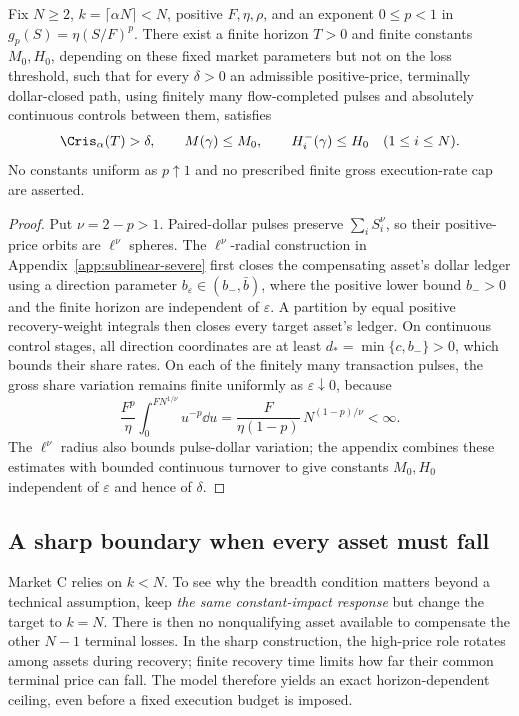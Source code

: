 \documentclass[review,hidelinks,onefignum,onetabnum]{siamonline250211}
\begin{document}
\begin{theorem}\label{thm:sublinear-severe}
Fix $N\ge2$, $k=\lceil\alpha N\rceil<N$, positive $F,\eta,\rho$,
and an exponent $0\le p<1$ in
$g_p(S)=\eta(S/F)^p$. There exist a finite horizon $T>0$
and finite constants $M_0,H_0$, depending on these fixed
market parameters but not on the loss threshold, such that for
every $\delta>0$ an admissible positive-price,
terminally dollar-closed path, using finitely many
flow-completed pulses and absolutely continuous controls
between them, satisfies
\[
\Cris_\alpha(T)>\delta,\qquad
M(\gamma)\le M_0,\qquad
H_i^-(\gamma)\le H_0\quad(1\le i\le N).
\]
No constants uniform as $p\uparrow1$ and no prescribed
finite gross execution-rate cap are asserted.
\end{theorem}
\begin{proof}
Put $\nu=2-p>1$. Paired-dollar pulses preserve
$\sum_iS_i^\nu$, so their positive-price orbits are
$\ell^\nu$ spheres. The $\ell^\nu$-radial construction in
Appendix~\ref{app:sublinear-severe} first closes the
compensating asset's dollar ledger using a direction
parameter $b_\varepsilon\in(b_-,\bar b)$, where the
positive lower bound $b_->0$ and the finite horizon
are independent of $\varepsilon$. A partition by equal
positive recovery-weight integrals then closes every
target asset's ledger. On continuous control stages,
all direction coordinates are at least
$d_*=\min\{c,b_-\}>0$, which bounds their share rates.
On each of the finitely many transaction pulses,
the gross share variation remains finite uniformly
as $\varepsilon\downarrow0$, because
\[
\frac{F^p}{\eta}\int_0^{FN^{1/\nu}}u^{-p}\dd u
=\frac{F}{\eta(1-p)}\,N^{(1-p)/\nu}<\infty.
\]
The $\ell^\nu$ radius also bounds pulse-dollar variation;
the appendix combines these estimates with bounded
continuous turnover to give constants $M_0,H_0$
independent of $\varepsilon$ and hence of $\delta$.
\end{proof}

\subsection{A sharp boundary when every asset must fall}\label{sec:allcoverage}
Market C relies on $k<N$. To see why the breadth condition matters beyond a technical assumption, keep \emph{the same constant-impact response} but change the target to $k=N$. There is then no nonqualifying asset available to compensate the other $N-1$ terminal losses. In the sharp construction, the high-price role rotates among assets during recovery; finite recovery time limits how far their common terminal price can fall. The model therefore yields an exact horizon-dependent ceiling, even before a fixed execution budget is imposed.
\end{document}
